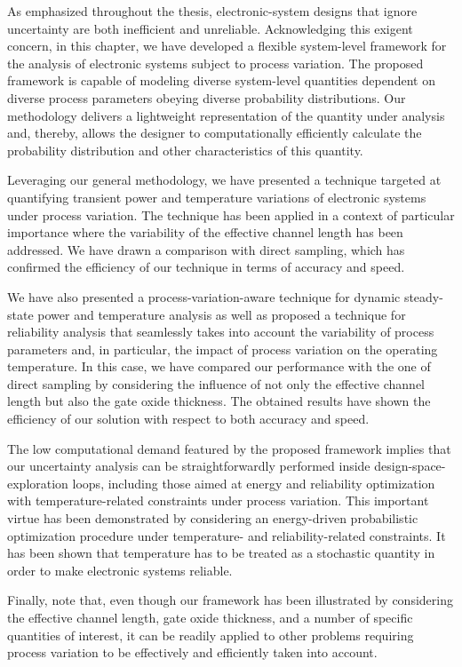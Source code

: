 As emphasized throughout the thesis, electronic-system designs that ignore
uncertainty are both inefficient and unreliable. Acknowledging this exigent
concern, in this chapter, we have developed a flexible system-level framework
for the analysis of electronic systems subject to process variation. The
proposed framework is capable of modeling diverse system-level quantities
dependent on diverse process parameters obeying diverse probability
distributions. Our methodology delivers a lightweight representation of the
quantity under analysis and, thereby, allows the designer to computationally
efficiently calculate the probability distribution and other characteristics of
this quantity.

Leveraging our general methodology, we have presented a technique targeted at
quantifying transient power and temperature variations of electronic systems
under process variation. The technique has been applied in a context of
particular importance where the variability of the effective channel length has
been addressed. We have drawn a comparison with direct sampling, which has
confirmed the efficiency of our technique in terms of accuracy and speed.

We have also presented a process-variation-aware technique for dynamic
steady-state power and temperature analysis as well as proposed a technique for
reliability analysis that seamlessly takes into account the variability of
process parameters and, in particular, the impact of process variation on the
operating temperature. In this case, we have compared our performance with the
one of direct sampling by considering the influence of not only the effective
channel length but also the gate oxide thickness. The obtained results have
shown the efficiency of our solution with respect to both accuracy and speed.

The low computational demand featured by the proposed framework implies that our
uncertainty analysis can be straightforwardly performed inside
design-space-exploration loops, including those aimed at energy and reliability
optimization with temperature-related constraints under process variation. This
important virtue has been demonstrated by considering an energy-driven
probabilistic optimization procedure under temperature- and reliability-related
constraints. It has been shown that temperature has to be treated as a
stochastic quantity in order to make electronic systems reliable.

Finally, note that, even though our framework has been illustrated by
considering the effective channel length, gate oxide thickness, and a number of
specific quantities of interest, it can be readily applied to other problems
requiring process variation to be effectively and efficiently taken into
account.
